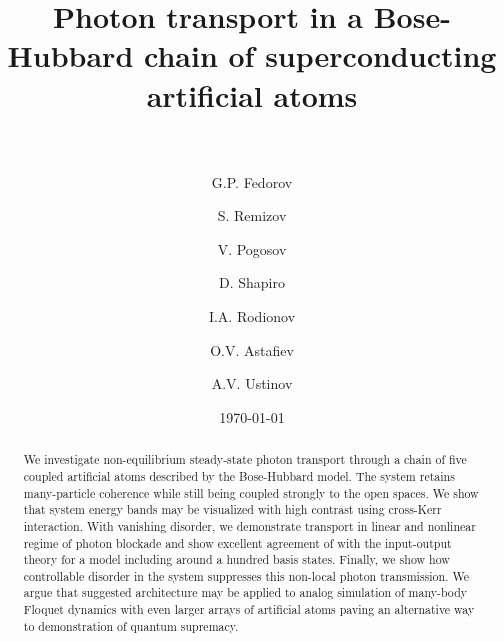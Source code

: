 \documentclass[%
 aps, pra,
 amsmath,amssymb,
 reprint,%
superscriptaddress
]{revtex4-2}
\newcommand{\mytitile}{Photon transport in a Bose-Hubbard chain of superconducting artificial atoms}
\begin{document}
	
	\title[\mytitile]{\mytitile\\~}
	\author{G.P. Fedorov}
	
	\author{S. Remizov}
	\author{V. Pogosov}
	\author{D. Shapiro}

	\author{I.A. Rodionov}

	\author{O.V. Astafiev}

	\author{A.V. Ustinov}
	
	
	\date{\today}%
	
	
	\begin{abstract}
We investigate non-equilibrium steady-state photon transport through a chain of five coupled artificial atoms described by the Bose-Hubbard model. The system retains many-particle coherence while still being coupled strongly to the open spaces. We show that system energy bands may be visualized with high contrast using cross-Kerr interaction. With vanishing disorder, we demonstrate transport in linear and nonlinear regime of photon blockade and show excellent agreement of with the input-output theory for a model including around a hundred basis states. Finally, we show how controllable disorder in the system suppresses this non-local photon transmission. We argue that suggested architecture may be applied to analog simulation of many-body Floquet dynamics with even larger arrays of artificial atoms paving an alternative way to demonstration of quantum supremacy.
\end{abstract}
	
\end{document}
